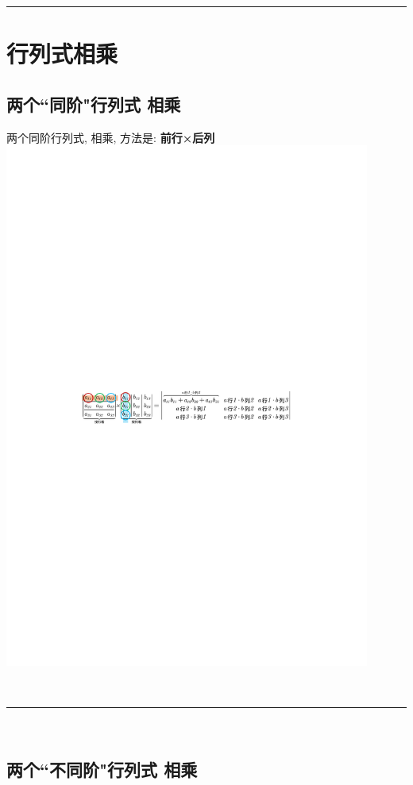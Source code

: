 \documentclass[UTF8]{ctexart}
\begin{document}
	

	\hrule

	\section{行列式相乘}
	
	\subsection{两个``同阶"行列式 相乘}
	
	两个同阶行列式, 相乘, 方法是:  \textbf{前行×后列} \\	
\includegraphics[width=0.9\textwidth]{img/0015.pdf}


~\\
\hrule
~\\


	
	\subsection{两个``不同阶"行列式 相乘}
	
\end{document}
